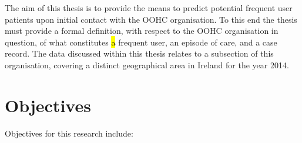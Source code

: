 The aim of this thesis is to provide the means to predict potential frequent user patients upon initial contact with the OOHC organisation. To this end the thesis must provide a formal definition, with respect to the OOHC organisation in question, of what constitutes \hl{a} frequent user, an episode of care, and a case record. The data discussed within this thesis relates to a subsection of this organisation, covering a distinct geographical area in Ireland for the year 2014.

\newpage

\section{Objectives}
\label{section:thesis-objectives}

Objectives for this research include:

